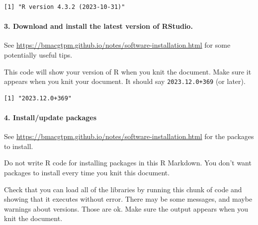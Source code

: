 \documentclass[
]{article}
\newenvironment{Shaded}{\begin{snugshade}}{\end{snugshade}}
\newcommand{\FunctionTok}[1]{\textcolor[rgb]{0.13,0.29,0.53}{\textbf{#1}}}
\newcommand{\NormalTok}[1]{#1}
\newcommand{\SpecialCharTok}[1]{\textcolor[rgb]{0.81,0.36,0.00}{\textbf{#1}}}
\begin{document}
\begin{Shaded}
\end{Shaded}

\begin{verbatim}
[1] "R version 4.3.2 (2023-10-31)"
\end{verbatim}

\hypertarget{download-and-install-the-latest-version-of-rstudio.}{%
\paragraph{3. Download and install the latest version of
RStudio.}\label{download-and-install-the-latest-version-of-rstudio.}}

See \url{https://bmacgtpm.github.io/notes/software-installation.html}
for some potentially useful tips.

This code will show your version of R when you knit the document. Make
sure it appears when you knit your document. It should say
\texttt{2023.12.0+369} (or later).

\begin{Shaded}
\end{Shaded}

\begin{verbatim}
[1] "2023.12.0+369"
\end{verbatim}

\hypertarget{installupdate-packages}{%
\paragraph{4. Install/update packages}\label{installupdate-packages}}

See \url{https://bmacgtpm.github.io/notes/software-installation.html}
for the packages to install.

Do not write R code for installing packages in this R Markdown. You
don't want packages to install every time you knit this document.

Check that you can load all of the libraries by running this chunk of
code and showing that it executes without error. There may be some
messages, and maybe warnings about versions. Those are ok. Make sure the
output appears when you knit the document.
\end{document}
